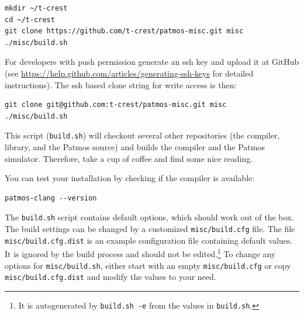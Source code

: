 \documentclass[a4paper,fontsize=10pt,twoside,DIV15,BCOR12mm,headinclude=true,footinclude=false,pagesize,bibtotoc]{scrbook}
\newcommand{\code}[1]{{\texttt{#1}}}
\newcommand{\comment}[3]{

\textsf{\textbf{#1}} {\color{#3}#2}}
\newcommand{\martin}[1]{\comment{Martin}{#1}{Blue}}
\newcommand{\stefan}[1]{\comment{Stefan}{#1}{RoyalPurple}}
\renewcommand{\martin}[1]{}
\renewcommand{\stefan}[1]{}
\begin{document}
\begin{verbatim}
mkdir ~/t-crest
cd ~/t-crest
git clone https://github.com/t-crest/patmos-misc.git misc
./misc/build.sh
\end{verbatim}


For developers with push permission generate an ssh key and upload
it at GitHub (see \url{https://help.github.com/articles/generating-ssh-keys}
for detailed instructions).
The ssh based clone string for write access is then:

\begin{verbatim}
git clone git@github.com:t-crest/patmos-misc.git misc
./misc/build.sh
\end{verbatim}

This script (\code{build.sh}) will checkout several other repositories (the compiler, library,
and the Patmos source) and
builds the compiler and the Patmos simulator.
Therefore, take a cup of coffee and find some nice reading.

You can test your installation by checking if the compiler is available:

\begin{verbatim}
patmos-clang --version
\end{verbatim}

The \code{build.sh} script contains default options, which should work out of the box. 
The build settings can be changed by a customized \code{misc/build.cfg} file. The file \code{misc/build.cfg.dist}
is an example configuration file containing default values. It is ignored by the build process and should not be
edited.\footnote{It is autogenerated by \code{build.sh -e} from the values in \code{build.sh}.}
To change any options for \code{misc/build.sh}, either start with an empty \code{misc/build.cfg} or
copy \code{misc/build.cfg.dist} and modify the values to your need.


\martin{In Mac OS X I have only .profile and I don't understand what the issue by 'only read by login terminals'.}
\stefan{Login shells are only opened at logins. Interactive terminals are all terminals that are opened by your window manager or
other means. This is why you need to reboot to have .profile take effect. There are slight differences between bash and zsh when which file is read, 
and distribution further mix up the files in non-standard ways.}

\stefan{Relative paths should actually work, but the \textasciitilde{} shortcut is shell-specific and may not work, but
not sure about this.}
\end{document}
